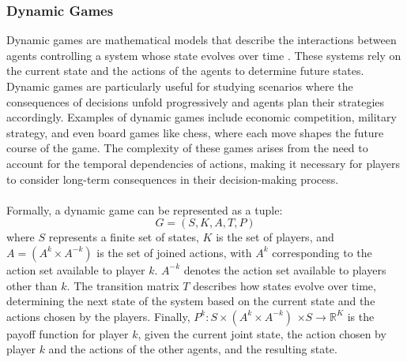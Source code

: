 \subsubsection{Dynamic Games}

\begin{flushleft}
    
    Dynamic games are mathematical models that describe the interactions between agents controlling a system whose state evolves over time \cite{dynamicgames/krawczyk-jacek}. These systems rely on the current state and the actions of the agents to determine future states. Dynamic games are particularly useful for studying scenarios where the consequences of decisions unfold progressively and agents plan their strategies accordingly. Examples of dynamic games include economic competition, military strategy, and even board games like chess, where each move shapes the future course of the game. The complexity of these games arises from the need to account for the temporal dependencies of actions, making it necessary for players to consider long-term consequences in their decision-making process.\\~\\

    Formally, a dynamic game can be represented as a tuple:
    \begin{equation}
        G = (S, K, A, T, P)
        \label{eq:dyngame}
    \end{equation}
    where $S$ represents a finite set of states, $K$ is the set of players, and $A = (A^k \times A^{-k})$ is the set of joined actions, with $A^k$ corresponding to the action set available to player $k$. $A^{-k}$ denotes the action set available to players other than $k$. The transition matrix $T$ describes how states evolve over time, determining the next state of the system based on the current state and the actions chosen by the players. Finally, $P^k: S \times (A^k \times A^{-k})$ \allowbreak $\times S \to \mathbb{R}^K$ is the payoff function for player $k$, given the current joint state, the action chosen by player $k$ and the actions of the other agents, and the resulting state.\\~\\


\end{flushleft}
